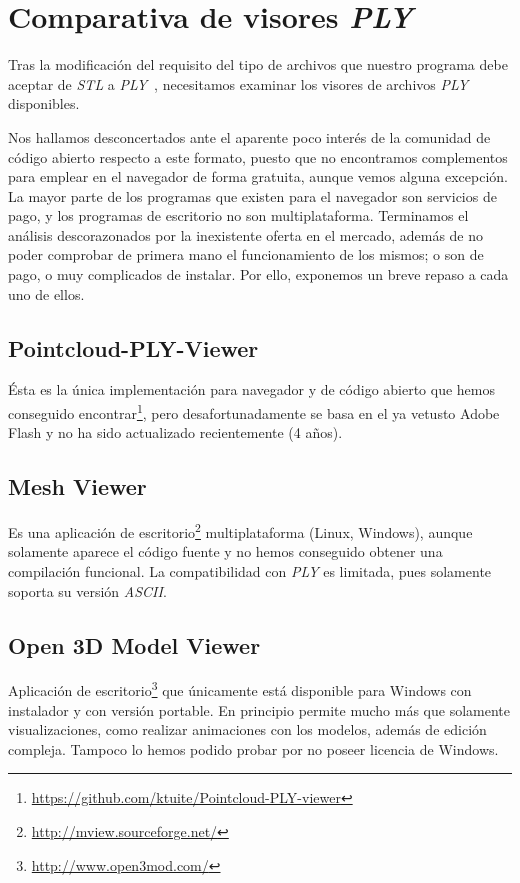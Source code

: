 \section {Comparativa de visores \textit{PLY}}
Tras la modificación del requisito del tipo de archivos que nuestro programa debe aceptar de \textit{STL} a \textit{PLY}~\cite{wiki:PLY}, necesitamos examinar los visores de archivos \textit{PLY} disponibles.

Nos hallamos desconcertados ante el aparente poco interés de la comunidad de código abierto respecto a este formato, puesto que no encontramos complementos para emplear en el navegador de forma gratuita, aunque vemos alguna excepción. La mayor parte de los programas que existen para el navegador son servicios de pago, y los programas de escritorio no son multiplataforma. Terminamos el análisis descorazonados por la inexistente oferta en el mercado, además de no poder comprobar de primera mano el funcionamiento de los mismos; o son de pago, o muy complicados de instalar. Por ello, exponemos un breve repaso a cada uno de ellos.

\subsection{Pointcloud-PLY-Viewer}
Ésta es la única implementación para navegador y de código abierto que hemos conseguido encontrar\footnote{\url{https://github.com/ktuite/Pointcloud-PLY-viewer}}, pero desafortunadamente se basa en el ya vetusto Adobe Flash y no ha sido actualizado recientemente (4 años).

\subsection{Mesh Viewer}
Es una aplicación de escritorio\footnote{\url{http://mview.sourceforge.net/}} multiplataforma (Linux, Windows), aunque solamente aparece el código fuente y no hemos conseguido obtener una compilación funcional. La compatibilidad con \textit{PLY} es limitada, pues solamente soporta su versión \textit{ASCII}.

\subsection{Open 3D Model Viewer}
Aplicación de escritorio\footnote{\url{http://www.open3mod.com/}} que únicamente está disponible para Windows con instalador y con versión portable. En principio permite mucho más que solamente visualizaciones, como realizar animaciones con los modelos, además de edición compleja. Tampoco lo hemos podido probar por no poseer licencia de Windows.

